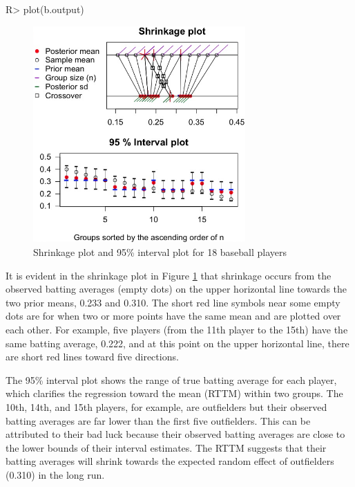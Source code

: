 \documentclass[article]{jss}
\begin{document}
\begin{CodeChunk}
\begin{CodeInput}
R> plot(b.output)
\end{CodeInput}
\end{CodeChunk}
\begin{figure}[h!]
\begin{center}
\includegraphics[width = 3.2in]{baseball1.png}
\caption{Shrinkage plot and 95\% interval plot for 18 baseball players}
\label{fig:baseball}
\end{center}
\end{figure}

It is evident in the shrinkage plot in Figure \ref{fig:baseball} that shrinkage occurs from the observed batting averages (empty dots) on the upper horizontal line towards the two prior means, 0.233 and 0.310. The short red line symbols near some empty dots are for when two or more points have the same mean and are plotted over each other. For example, five players (from the 11th player to the 15th) have the same batting average, 0.222, and at this point on the upper horizontal line, there are short red lines toward five directions.



The 95\% interval plot shows the range of true batting average for each player, which clarifies the regression toward the mean (RTTM) within two groups. The 10th, 14th, and 15th players, for example, are outfielders but their observed batting averages are far lower than the first five outfielders. This can  be attributed to their bad luck because their observed batting averages are close to the lower bounds of their interval estimates. The RTTM suggests that their batting averages will shrink towards the expected random effect of outfielders (0.310) in the long run.
\end{document}
